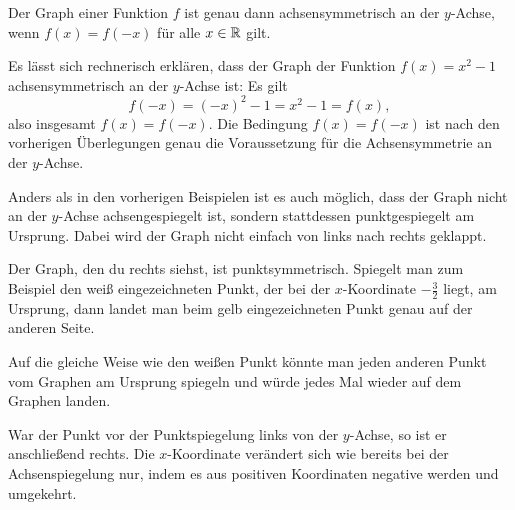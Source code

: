 \documentclass[../../main.tex]{subfiles}
\begin{document}
\begin{theorem}{}
    Der Graph einer Funktion $f$ ist genau dann achsensymmetrisch an der $y$-Achse, wenn $f(x)=f(-x)$ für alle $x\in\mathbb{R}$ gilt.
\end{theorem}

\begin{example}{}
    Es lässt sich rechnerisch erklären, dass der Graph der Funktion $f(x)=x^2-1$ achsensymmetrisch an der $y$-Achse ist: Es gilt \[f(-x)=(-x)^2-1=x^2-1=f(x),\] also insgesamt $f(x)=f(-x)$. Die Bedingung $f(x)=f(-x)$ ist nach den vorherigen Überlegungen genau die Voraussetzung für die Achsensymmetrie an der $y$-Achse.
\end{example}

Anders als in den vorherigen Beispielen ist es auch möglich, dass der Graph nicht an der $y$-Achse achsengespiegelt ist, sondern stattdessen punktgespiegelt am Ursprung. Dabei wird der Graph nicht einfach von links nach rechts geklappt.

\begin{example}{}
    Der Graph, den du rechts siehst, ist punktsymmetrisch. Spiegelt man zum Beispiel den weiß eingezeichneten Punkt, der bei der $x$-Koordinate $-\frac{3}{2}$ liegt, am Ursprung, dann landet man beim gelb eingezeichneten Punkt genau auf der anderen Seite.
    
    Auf die gleiche Weise wie den weißen Punkt könnte man jeden anderen Punkt vom Graphen am Ursprung spiegeln und würde jedes Mal wieder auf dem Graphen landen.
    
    War der Punkt vor der Punktspiegelung links von der $y$-Achse, so ist er anschließend rechts. Die $x$-Koordinate verändert sich wie bereits bei der Achsenspiegelung nur, indem es aus positiven Koordinaten negative werden und umgekehrt.
\end{example}
\end{document}
